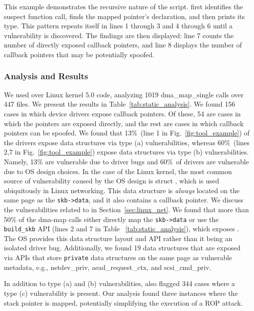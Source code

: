This example demonstrates the recursive nature of the script.
\tool first identifies the suspect function call, finds the mapped pointer's declaration, and then prints its type. This pattern repeats itself in lines 1 through 3 and 4 through 6 until a vulnerability is discovered. The findings are then displayed: line 7 counts the number of directly exposed callback pointers, and line 8 displays the number of callback pointers that may be potentially spoofed.



\subsubsection{Analysis and Results}
We used \tool over Linux kernel 5.0 code,
analyzing 1019 dma\_map\_single calls over 447 files. We present the results in Table~\ref{tab:static_analysis}. 
We found 156 cases in which device drivers expose callback pointers. Of these, 54 are cases in which the pointers are exposed directly, and the rest are cases in which callback pointers can be spoofed.
We found that 13\%~(line 1 in Fig.~\ref{fig:tool_example}) of the drivers expose data structures via type (a) vulnerabilities, whereas 60\%~(lines 2,7 in Fig.~\ref{fig:tool_example}) expose data structures via type (b) vulnerabilities. Namely, 13\% are vulnerable due to driver bugs and 60\%~of drivers are vulnerable due to OS design choices. In the case of the Linux kernel, the most common source of vulnerability caused by the OS design is struct \shinfo, which is used ubiquitously in Linux networking. This data structure is \textit{always} located on the same page as the \texttt{skb->data}, and it also contains a callback pointer. We discuss the vulnerabilities related to \shinfo in Section~\ref{sec:linux_net}. We found that more than 50\% of the dma-map calls either directly map the \texttt{skb->data} or use the \texttt{build\_skb} API (lines 2 and 7 in Table ~\ref{tab:static_analysis}), which exposes \shinfo. The OS provides this data structure layout and API rather than it being an isolated driver bug. Additionally, we found 19 data structures that are exposed via APIs that store \texttt{private} data structures on the same page as vulnerable metadata, e.g., netdev\_priv, aead\_request\_ctx, and scsi\_cmd\_priv.

In addition to type (a) and (b) vulnerabilities, \tool also flagged 344 cases where a type (c) vulnerability is present. Our analysis found three instances where the stack pointer is mapped, potentially simplifying the execution of a ROP attack.

